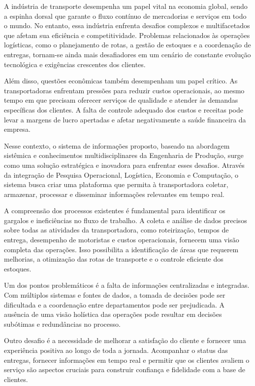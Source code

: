 A indústria de transporte desempenha um papel vital na economia global, sendo a espinha dorsal que garante o fluxo contínuo de mercadorias e serviços em todo o mundo. No entanto, essa indústria enfrenta desafios complexos e multifacetados que afetam sua eficiência e competitividade. Problemas relacionados às operações logísticas, como o planejamento de rotas, a gestão de estoques e a coordenação de entregas, tornam-se ainda mais desafiadores em um cenário de constante evolução tecnológica e exigências crescentes dos clientes.

Além disso, questões econômicas também desempenham um papel crítico. As transportadoras enfrentam pressões para reduzir custos operacionais, ao mesmo tempo em que precisam oferecer serviços de qualidade e atender às demandas específicas dos clientes. A falta de controle adequado dos custos e receitas pode levar a margens de lucro apertadas e afetar negativamente a saúde financeira da empresa.

Nesse contexto, o sistema de informações proposto, baseado na abordagem sistêmica e conhecimentos multidisciplinares da Engenharia de Produção, surge como uma solução estratégica e inovadora para enfrentar esses desafios. Através da integração de Pesquisa Operacional, Logística, Economia e Computação, o sistema busca criar uma plataforma que permita à transportadora coletar, armazenar, processar e disseminar informações relevantes em tempo real.

A compreensão dos processos existentes é fundamental para identificar os gargalos e ineficiências no fluxo de trabalho. A coleta e análise de dados precisos sobre todas as atividades da transportadora, como roteirização, tempos de entrega, desempenho de motoristas e custos operacionais, fornecem uma visão completa das operações. Isso possibilita a identificação de áreas que requerem melhorias, a otimização das rotas de transporte e o controle eficiente dos estoques.

Um dos pontos problemáticos é a falta de informações centralizadas e integradas. Com múltiplos sistemas e fontes de dados, a tomada de decisões pode ser dificultada e a coordenação entre departamentos pode ser prejudicada. A ausência de uma visão holística das operações pode resultar em decisões subótimas e redundâncias no processo.

Outro desafio é a necessidade de melhorar a satisfação do cliente e fornecer uma experiência positiva ao longo de toda a jornada. Acompanhar o status das entregas, fornecer informações em tempo real e permitir que os clientes avaliem o serviço são aspectos cruciais para construir confiança e fidelidade com a base de clientes.

